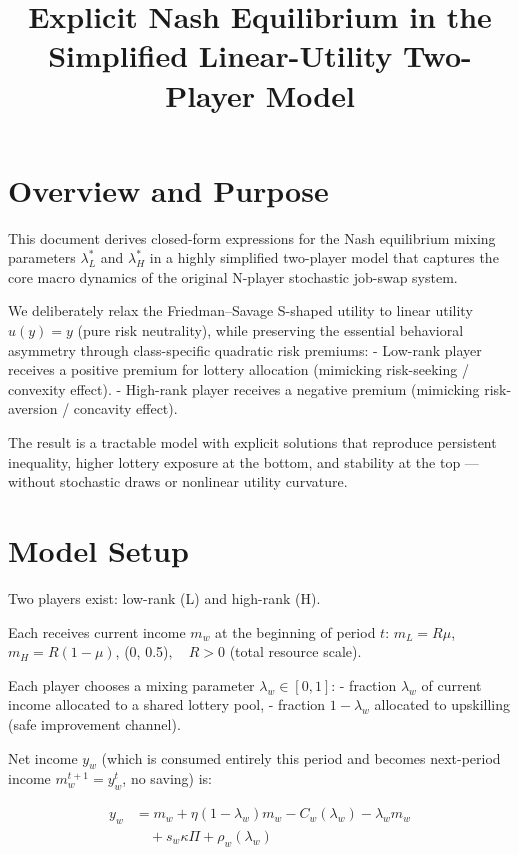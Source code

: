\documentclass[11pt]{article}
\title{Explicit Nash Equilibrium in the Simplified Linear-Utility Two-Player Model}
\author{}
\date{}
\begin{document}
\maketitle

\section{Overview and Purpose}

This document derives closed-form expressions for the Nash equilibrium mixing parameters $\lambda_L^*$ and $\lambda_H^*$ in a highly simplified two-player model that captures the core macro dynamics of the original N-player stochastic job-swap system.  

We deliberately relax the Friedman--Savage S-shaped utility to linear utility $u(y) = y$ (pure risk neutrality), while preserving the essential behavioral asymmetry through class-specific quadratic risk premiums:  
- Low-rank player receives a positive premium for lottery allocation (mimicking risk-seeking / convexity effect).  
- High-rank player receives a negative premium (mimicking risk-aversion / concavity effect).  

The result is a tractable model with explicit solutions that reproduce persistent inequality, higher lottery exposure at the bottom, and stability at the top — without stochastic draws or nonlinear utility curvature.

\section{Model Setup}

Two players exist: low-rank (L) and high-rank (H).  

Each receives current income $m_w$ at the beginning of period $t$:  
$m_L = R \mu$, \quad $m_H = R(1-\mu)$, \quad \mu \in (0, 0.5)$, \quad R > 0$ (total resource scale).

Each player chooses a mixing parameter $\lambda_w \in [0,1]$:  
- fraction $\lambda_w$ of current income allocated to a shared lottery pool,  
- fraction $1 - \lambda_w$ allocated to upskilling (safe improvement channel).

Net income $y_w$ (which is consumed entirely this period and becomes next-period income $m_w^{t+1} = y_w^t$, no saving) is:

\begin{align*}
y_w &= m_w + \eta(1 - \lambda_w) m_w - C_w(\lambda_w) - \lambda_w m_w \\
    &\quad + s_w \kappa \Pi + \rho_w(\lambda_w)
\end{align*}
\end{document}
